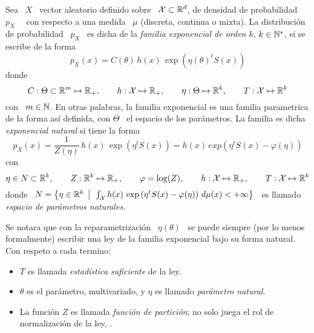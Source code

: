 \begin{definicion}\label{Def:MP:FamiliaExponencial}
%
  Sea  \ $X$  \  vector aleatorio  definido  sobre \  $\mathcal{X}  \subset \mathbb{R}^d$,  de
  densidad  de probabilidad  \  $p_X$ \  \ con  respecto  a una  medida \  $\mu$
  (discreta, continua o  mixta). La distribuci\'on de probabilidad  \ $p_X$ \ es
  dicha de  la {\em familia  exponencial de orden  $k$}, $k \in \mathbb{N}^*$,  si se
  escribe de la forma
  \[
  p_X(x) = C(\theta) \, h(x) \, \exp\left( \eta(\theta)^t S(x) \right)
  \]
  donde
  \[
  C:  \Theta \subset  \mathbb{R}^m \mapsto  \mathbb{R}_+,  \qquad h:  \mathcal{X} \mapsto  \mathbb{R}_+,
  \qquad \eta: \Theta \mapsto \mathbb{R}^k, \qquad T: \mathcal{X} \mapsto \mathbb{R}^k
  \]
  con \ $m \in \mathbb{N}$.  En otras palabras, la familia exponencial es una familia
  parametrica  de la  forma as\'i  definida, con  $\Theta$ \  el espacio  de los
  par\'ametros. La familia es dicha {\em exponencial natural} si tiene la forma
  \[
  p_X(x) = \frac{1}{Z(\eta)}  \, h(x) \, \exp\left( \eta^t  S(x) \right) = h(x)
  \, exp\left( \eta^t S(x) - \varphi(\eta) \right)
  \]
  con
  \[
  \eta \in N \subset \mathbb{R}^k, \qquad Z: \mathbb{R}^k \mapsto \mathbb{R}_+, \qquad \varphi = \log(Z),
  \qquad h: \mathcal{X} \mapsto \mathbb{R}_+, \qquad T: \mathcal{X} \mapsto \mathbb{R}^k
  \]
  donde \  $N = \left\{ \eta \in  \mathbb{R}^k \:\: \big| \:\: \int_{\mathcal{X}} h(x)  \, \exp\left( \eta^t
      S(x) - \varphi(\eta) \right) \, d\mu(x)  < + \infty \right\}$ \ es llamado
  {\em espacio de par\'ametros naturales}.
\end{definicion}
%
Se notara  que con  la reparametrizaci\'on \  $\eta(\theta)$ \ se  puede siempre
(por lo  menos formalmente) escribir una  ley de la familia  exponencial bajo su
forma natural. Con respeto a cada termino:
%
\begin{itemize}
\item $T$ es llamada {\em estad\'istica suficiente} de la ley. 
%
\item  $\theta$  es el  par\'ametro,  multivariado,  y  $\eta$ es  llamado  {\em
    par\'ametro natural}.
%
\item La funci\'on $Z$ es llamada  {\em funci\'on de partici\'on}; no solo juega
  el  rol de  normalizaci\'on  de  la ley,  .
\end{itemize}

